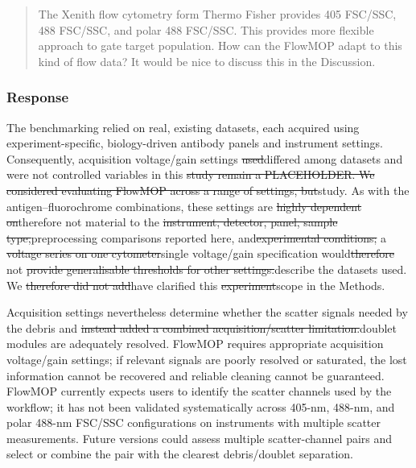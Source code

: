 \documentclass[
  11pt,
  a4paper,
]{article}
\begin{document}
\begin{quote}
The Xenith flow cytometry form Thermo Fisher provides 405 FSC/SSC, 488
FSC/SSC, and polar 488 FSC/SSC. This provides more flexible approach to
gate target population. How can the FlowMOP adapt to this kind of flow
data? It would be nice to discuss this in the Discussion.
\end{quote}

\subsubsection{Response}\label{response-7}

The {\color{revisionblue}benchmarking relied on real, existing datasets,
each acquired using experiment-specific, biology-driven antibody panels
and instrument settings. Consequently,} acquisition voltage/gain
settings {\color{revisionred}\sout{used}}{\color{revisionblue}differed
among datasets and were not controlled variables} in this
{\color{revisionred}\sout{study remain a PLACEHOLDER. We considered
evaluating FlowMOP across a range of settings,
but}}{\color{revisionblue}study. As with the antigen--fluorochrome
combinations,} these {\color{revisionblue}settings} are
{\color{revisionred}\sout{highly dependent
on}}{\color{revisionblue}therefore not material to} the
{\color{revisionred}\sout{instrument, detector, panel, sample
type,}}{\color{revisionblue}preprocessing comparisons reported here,}
and{\color{revisionred}\sout{experimental conditions;}} a
{\color{revisionred}\sout{voltage series on one
cytometer}}{\color{revisionblue}single voltage/gain specification}
would{\color{revisionred}\sout{therefore}} not
{\color{revisionred}\sout{provide generalisable thresholds for other
settings.}}{\color{revisionblue}describe the datasets used.} We
{\color{revisionred}\sout{therefore did not
add}}{\color{revisionblue}have clarified} this
{\color{revisionred}\sout{experiment}}{\color{revisionblue}scope in the
Methods.}

{\color{revisionblue}Acquisition settings nevertheless determine whether
the scatter signals needed by the debris} and
{\color{revisionred}\sout{instead added a combined acquisition/scatter
limitation.}}{\color{revisionblue}doublet modules are adequately
resolved.} FlowMOP requires appropriate acquisition voltage/gain
settings; if relevant signals are poorly resolved or saturated, the lost
information cannot be recovered and reliable cleaning cannot be
guaranteed. FlowMOP currently expects users to identify the scatter
channels used by the workflow; it has not been validated systematically
across 405-nm, 488-nm, and polar 488-nm FSC/SSC configurations on
instruments with multiple scatter measurements. Future versions could
assess multiple scatter-channel pairs and select or combine the pair
with the clearest debris/doublet separation.
\end{document}
